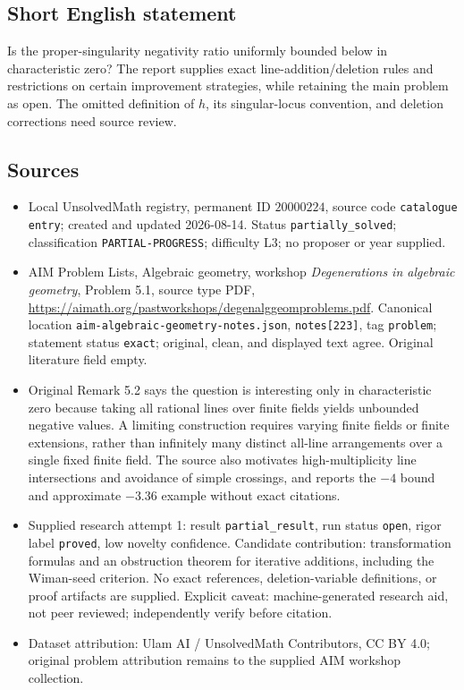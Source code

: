 \documentclass[11pt]{article}
\begin{document}
\subsection{Short English statement}
Is the proper-singularity negativity ratio uniformly bounded below in characteristic zero? The report supplies exact line-addition/deletion rules and restrictions on certain improvement strategies, while retaining the main problem as open. The omitted definition of $h$, its singular-locus convention, and deletion corrections need source review.
\subsection{Sources}
\begin{itemize}
\item Local UnsolvedMath registry, permanent ID $20000224$, source code \texttt{catalogue entry}; created and updated 2026-08-14. Status \texttt{partially\_solved}; classification \texttt{PARTIAL-PROGRESS}; difficulty L3; no proposer or year supplied.
\item AIM Problem Lists, Algebraic geometry, workshop \emph{Degenerations in algebraic geometry}, Problem 5.1, source type PDF, \url{https://aimath.org/pastworkshops/degenalggeomproblems.pdf}. Canonical location \texttt{aim-algebraic-geometry-notes.json}, \texttt{notes[223]}, tag \texttt{problem}; statement status \texttt{exact}; original, clean, and displayed text agree. Original literature field empty.
\item Original Remark 5.2 says the question is interesting only in characteristic zero because taking all rational lines over finite fields yields unbounded negative values. A limiting construction requires varying finite fields or finite extensions, rather than infinitely many distinct all-line arrangements over a single fixed finite field. The source also motivates high-multiplicity line intersections and avoidance of simple crossings, and reports the $-4$ bound and approximate $-3.36$ example without exact citations.
\item Supplied research attempt 1: result \texttt{partial\_result}, run status \texttt{open}, rigor label \texttt{proved}, low novelty confidence. Candidate contribution: transformation formulas and an obstruction theorem for iterative additions, including the Wiman-seed criterion. No exact references, deletion-variable definitions, or proof artifacts are supplied. Explicit caveat: machine-generated research aid, not peer reviewed; independently verify before citation.
\item Dataset attribution: Ulam AI / UnsolvedMath Contributors, CC BY 4.0; original problem attribution remains to the supplied AIM workshop collection.
\end{itemize}
\end{document}
